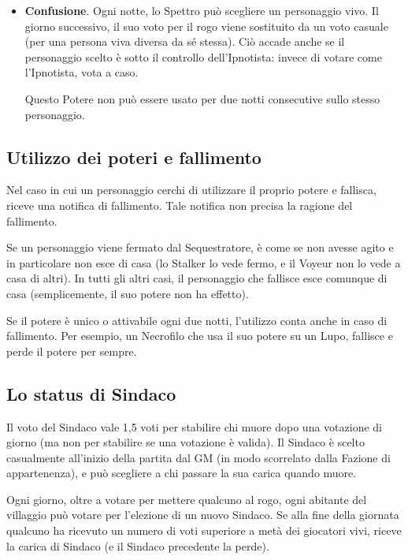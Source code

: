 \documentclass[a4paper,10pt]{article}
\begin{document}
\begin{itemize}
 \item {\bf Confusione}.  Ogni notte, lo Spettro può scegliere un personaggio vivo. Il giorno successivo, il suo voto per il rogo viene sostituito da un voto casuale (per una persona viva diversa da sé stessa). Ciò accade anche se il personaggio scelto è sotto il controllo dell'Ipnotista: invece di votare come l'Ipnotista, vota a caso.
 
  Questo Potere non può essere usato per due notti consecutive sullo stesso personaggio.

\end{itemize}


\subsection{Utilizzo dei poteri e fallimento}

Nel caso in cui un personaggio cerchi di utilizzare il proprio potere e fallisca, riceve una notifica di fallimento. Tale notifica non precisa la ragione del fallimento.

Se un personaggio viene fermato dal Sequestratore, è come se non avesse agito e in particolare non esce di casa (lo Stalker lo vede fermo, e il Voyeur non lo vede a casa di altri).
In tutti gli altri casi, il personaggio che fallisce esce comunque di casa (semplicemente, il suo potere non ha effetto).

Se il potere è unico o attivabile ogni due notti, l'utilizzo conta anche in caso di fallimento. Per esempio, un Necrofilo che usa il suo potere su un Lupo, fallisce e perde il potere per sempre.

\subsection{Lo status di Sindaco}
\label{sindaco}

Il voto del Sindaco vale 1,5 voti per stabilire chi muore dopo una votazione di giorno (ma non per stabilire se una votazione è valida).
Il Sindaco è scelto casualmente all'inizio della partita dal GM (in modo scorrelato dalla Fazione di appartenenza), e può scegliere a chi passare la sua carica quando muore.

Ogni giorno, oltre a votare per mettere qualcuno al rogo, ogni abitante del villaggio può votare per l'elezione di un nuovo Sindaco. Se alla fine della giornata qualcuno ha ricevuto un numero di voti superiore a metà dei giocatori vivi, riceve la carica di Sindaco (e il Sindaco precedente la perde).
\end{document}
